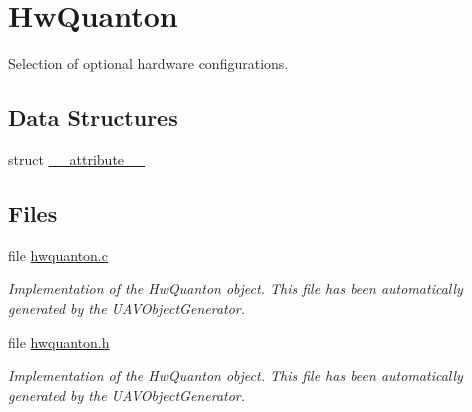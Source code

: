\hypertarget{group___hw_quanton}{\section{\-Hw\-Quanton}
\label{group___hw_quanton}
}


\-Selection of optional hardware configurations.  


\subsection*{\-Data \-Structures}
\begin{DoxyCompactItemize}
\item 
struct \hyperlink{struct____attribute____}{\-\_\-\-\_\-attribute\-\_\-\-\_\-}
\end{DoxyCompactItemize}
\subsection*{\-Files}
\begin{DoxyCompactItemize}
\item 
file \hyperlink{hwquanton_8c}{hwquanton.\-c}
\begin{DoxyCompactList}\small\item\em \-Implementation of the \-Hw\-Quanton object. \-This file has been automatically generated by the \-U\-A\-V\-Object\-Generator. \end{DoxyCompactList}\item 
file \hyperlink{hwquanton_8h}{hwquanton.\-h}
\begin{DoxyCompactList}\small\item\em \-Implementation of the \-Hw\-Quanton object. \-This file has been automatically generated by the \-U\-A\-V\-Object\-Generator. \end{DoxyCompactList}\end{DoxyCompactItemize}
